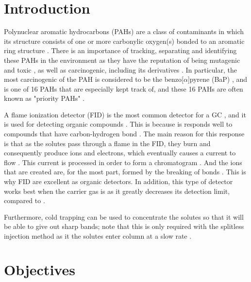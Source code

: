 \documentclass[a4paper, 12pt]{article}
\begin{document}
\section{Introduction}
Polynuclear aromatic hydrocarbons (PAHs) are a class of contaminants in which its structure consists of one or more carbonylic oxygen(s) bonded to an aromatic ring structure \cite{sft-pah}. There is an importance of tracking, separating and identifying these PAHs in the environment as they have the reputation of being mutagenic and toxic \cite{sft-pah}, as well as carcinogenic, including its derivatives \cite{iupac-pah}. In particular, the most carcinogenic of the PAH is considered to be the benzo[$\alpha$]pyrene (BaP) \cite{coffee-pah}, and is one of 16 PAHs \cite{iupac-pah} that are especially kept track of, and these 16 PAHs are often known as "priority PAHs" \cite{sft-pah}.

A flame ionization detector (FID) is the most common detector for a GC \cite{sparkman_gas_2011}, and it is used for detecting organic compounds \cite{vitha_chromatography:_2017}. This is because is responds well to compounds that have carbon-hydrogen bond \cite{sparkman_gas_2011}. The main reason for this response is that as the solutes pass through a flame in the FID, they burn and consequently produce ions and electrons, which eventually causes a current to flow \cite{sparkman_gas_2011}. This current is processed in order to form a chromatogram \cite{vitha_chromatography:_2017}. And the ions that are created are, for the most part, formed by the breaking of  bonds \cite{vitha_chromatography:_2017}. This is why FID are excellent as organic detectors. In addition, this type of detector works best when the carrier gas is  as it greatly decreases its detection limit, compared to  \cite{harris_quantitative_2010}.

Furthermore, cold trapping can be used to concentrate the solutes so that it will be able to give out sharp bands; note that this is only required with the splitless injection method as it the solutes enter column at a slow rate \cite{harris_quantitative_2010}.


\section{Objectives}
\end{document}
